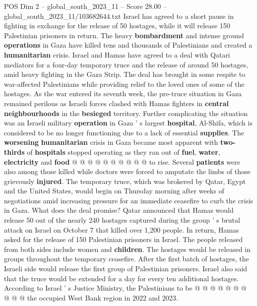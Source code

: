 \begin{textsample}{POS Dim 2 – global\_south\_2023\_11 – Score 28.00 – global\_south\_2023\_11/103682644.txt}  \label{ex:f2_pos_097}
Israel has agreed to a short pause in fighting in exchange for the release of 50 hostages, while it will release 150 Palestinian prisoners in return.
The heavy \textbf{bombardment} and intense ground \textbf{operations} in Gaza have killed tens and thousands of Palestinians and created a \textbf{humanitarian} crisis.
Israel and Hamas have agreed to a deal with Qatari mediators for a four-day temporary truce and the release of around 50 hostages, amid heavy fighting in the Gaza Strip.
The deal has brought in some respite to war-affected Palestinians while providing relief to the loved ones of some of the hostages.
As the war entered its seventh week, the pre-truce situation in Gaza remained perilous as Israeli forces clashed with Hamas fighters in \textbf{central} \textbf{neighbourhoods} in the \textbf{besieged} territory.
Further complicating the situation was an Israeli military \textbf{operation} in Gaza ' s largest \textbf{hospital}, Al-Shifa, which is considered to be no longer functioning due to a lack of essential \textbf{supplies}.
The \textbf{worsening} \textbf{humanitarian} crisis in Gaza became most apparent with \textbf{two-thirds} of \textbf{hospitals} stopped operating as they ran out of \textbf{fuel}, \textbf{water}, \textbf{electricity} and \textbf{food} @ @ @ @ @ @ @ @ @ @ to rise.
Several \textbf{patients} were also among those killed while doctors were forced to amputate the limbs of those grievously \textbf{injured}.
The temporary truce, which was brokered by Qatar, Egypt and the United States, would begin on Thursday morning after weeks of negotiations amid increasing pressure for an immediate ceasefire to curb the crisis in Gaza.
What does the deal promise?
Qatar announced that Hamas would release 50 out of the nearly 240 hostages captured during the group ' s brutal attack on Israel on October 7 that killed over 1,200 people.
In return, Hamas asked for the release of 150 Palestinian prisoners in Israel.
The people released from both sides include women and \textbf{children}.
The hostages would be released in groups throughout the temporary ceasefire.
After the first batch of hostages, the Israeli side would release the first group of Palestinian prisoners.
Israel also said that the truce would be extended for a day for every ten additional hostages.
According to Israel ' s Justice Ministry, the Palestinians to be @ @ @ @ @ @ @ @ @ @ the occupied West Bank region in 2022 and 2023.

\end{textsample}

